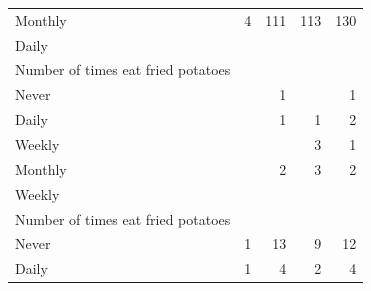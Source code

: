 \documentclass{article}
\begin{document}
\begin{table}[!h]
{\begin{tabular}{lllll}
			\multicolumn{1}{l}{\hspace{5em}Monthly} &
			\multicolumn{1}{|r}{4} &
			\multicolumn{1}{r}{111} &
			\multicolumn{1}{r}{113} &
			\multicolumn{1}{r}{130} \\
			\multicolumn{1}{l}{\hspace{3em}Daily} &
			\multicolumn{1}{|r}{} &
			\multicolumn{1}{r}{} &
			\multicolumn{1}{r}{} &
			\multicolumn{1}{r}{} \\
			\multicolumn{1}{l}{\hspace{4em}Number of times eat fried potatoes} &
			\multicolumn{1}{|r}{} &
			\multicolumn{1}{r}{} &
			\multicolumn{1}{r}{} &
			\multicolumn{1}{r}{} \\
			\multicolumn{1}{l}{\hspace{5em}Never} &
			\multicolumn{1}{|r}{} &
			\multicolumn{1}{r}{1} &
			\multicolumn{1}{r}{} &
			\multicolumn{1}{r}{1} \\
			\multicolumn{1}{l}{\hspace{5em}Daily} &
			\multicolumn{1}{|r}{} &
			\multicolumn{1}{r}{1} &
			\multicolumn{1}{r}{1} &
			\multicolumn{1}{r}{2} \\
			\multicolumn{1}{l}{\hspace{5em}Weekly} &
			\multicolumn{1}{|r}{} &
			\multicolumn{1}{r}{} &
			\multicolumn{1}{r}{3} &
			\multicolumn{1}{r}{1} \\
			\multicolumn{1}{l}{\hspace{5em}Monthly} &
			\multicolumn{1}{|r}{} &
			\multicolumn{1}{r}{2} &
			\multicolumn{1}{r}{3} &
			\multicolumn{1}{r}{2} \\
			\multicolumn{1}{l}{\hspace{3em}Weekly} &
			\multicolumn{1}{|r}{} &
			\multicolumn{1}{r}{} &
			\multicolumn{1}{r}{} &
			\multicolumn{1}{r}{} \\
			\multicolumn{1}{l}{\hspace{4em}Number of times eat fried potatoes} &
			\multicolumn{1}{|r}{} &
			\multicolumn{1}{r}{} &
			\multicolumn{1}{r}{} &
			\multicolumn{1}{r}{} \\
			\multicolumn{1}{l}{\hspace{5em}Never} &
			\multicolumn{1}{|r}{1} &
			\multicolumn{1}{r}{13} &
			\multicolumn{1}{r}{9} &
			\multicolumn{1}{r}{12} \\
			\multicolumn{1}{l}{\hspace{5em}Daily} &
			\multicolumn{1}{|r}{1} &
			\multicolumn{1}{r}{4} &
			\multicolumn{1}{r}{2} &
			\multicolumn{1}{r}{4} \\

\end{tabular}}
\end{table}
\end{document}
